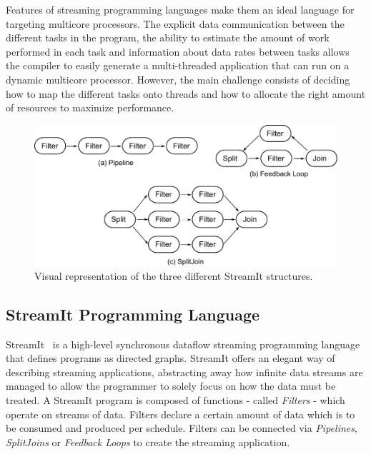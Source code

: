 Features of streaming programming languages make them an ideal language for targeting multicore processors.
The explicit data communication between the different tasks in the program, the ability to estimate the amount of work performed in each task and information about data rates between tasks allows the compiler to easily generate a multi-threaded application that can run on a dynamic multicore processor.
However, the main challenge consists of deciding how to map the different tasks onto threads and how to allocate the right amount of resources to maximize performance.


\begin{figure}
    \centering
    \includegraphics[width=1\textwidth]{streamit-paper/graphics/streamit_types.pdf}
    \caption{Visual representation of the three different StreamIt structures.}
    \label{fig:streamittypes}
\end{figure}

\subsection{StreamIt Programming Language}
StreamIt~\cite{theis2002streamit} is a high-level synchronous dataflow streaming programming language that defines programs as directed graphs.
StreamIt offers an elegant way of describing streaming applications, abstracting away how infinite data streams are managed to allow the programmer to solely focus on how the data must be treated.
A StreamIt program is composed of functions - called \textit{Filters} - which operate on streams of data.
Filters declare a certain amount of data which is to be consumed and produced per schedule.
Filters can be connected via \textit{Pipelines}, \textit{SplitJoins} or \textit{Feedback Loops} to create the streaming application.

